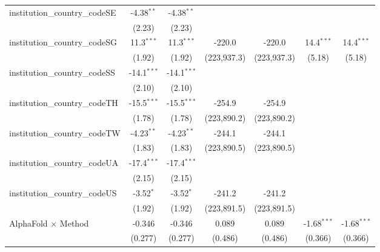 \begin{tabular}{lcccccc}
   institution\_country\_codeSE          & -4.38$^{**}$  & -4.38$^{**}$  &               &               &               &   \\   
                                         & (2.23)        & (2.23)        &               &               &               &   \\   
   institution\_country\_codeSG          & 11.3$^{***}$  & 11.3$^{***}$  & -220.0        & -220.0        & 14.4$^{***}$  & 14.4$^{***}$\\   
                                         & (1.92)        & (1.92)        & (223,937.3)   & (223,937.3)   & (5.18)        & (5.18)\\   
   institution\_country\_codeSS          & -14.1$^{***}$ & -14.1$^{***}$ &               &               &               &   \\   
                                         & (2.10)        & (2.10)        &               &               &               &   \\   
   institution\_country\_codeTH          & -15.5$^{***}$ & -15.5$^{***}$ & -254.9        & -254.9        &               &   \\   
                                         & (1.78)        & (1.78)        & (223,890.2)   & (223,890.2)   &               &   \\   
   institution\_country\_codeTW          & -4.23$^{**}$  & -4.23$^{**}$  & -244.1        & -244.1        &               &   \\   
                                         & (1.83)        & (1.83)        & (223,890.5)   & (223,890.5)   &               &   \\   
   institution\_country\_codeUA          & -17.4$^{***}$ & -17.4$^{***}$ &               &               &               &   \\   
                                         & (2.15)        & (2.15)        &               &               &               &   \\   
   institution\_country\_codeUS          & -3.52$^{*}$   & -3.52$^{*}$   & -241.2        & -241.2        &               &   \\   
                                         & (1.92)        & (1.92)        & (223,891.5)   & (223,891.5)   &               &   \\   
   AlphaFold $\times$ Method             & -0.346        & -0.346        & 0.089         & 0.089         & -1.68$^{***}$ & -1.68$^{***}$\\   
                                         & (0.277)       & (0.277)       & (0.486)       & (0.486)       & (0.366)       & (0.366)\\   

\end{tabular}
